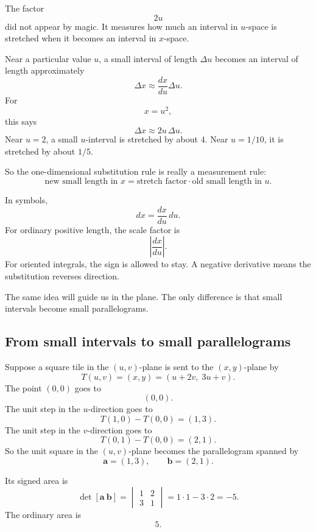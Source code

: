 The factor
\[
    2u
\]
did not appear by magic.  It measures how much an interval in \(u\)-space is stretched
when it becomes an interval in \(x\)-space.

Near a particular value \(u\), a small interval of length \(\Delta u\) becomes an interval
of length approximately
\[
    \Delta x\approx \frac{dx}{du}\Delta u.
\]
For
\[
    x=u^2,
\]
this says
\[
    \Delta x\approx 2u\,\Delta u.
\]
Near \(u=2\), a small \(u\)-interval is stretched by about \(4\).  Near \(u=1/10\), it is
stretched by about \(1/5\).

So the one-dimensional substitution rule is really a measurement rule:
\[
\boxed{
    \text{new small length in }x
    =
    \text{stretch factor}\cdot \text{old small length in }u.
}
\]

In symbols,
\[
    dx=\frac{dx}{du}\,du.
\]
For ordinary positive length, the scale factor is
\[
    \left|\frac{dx}{du}\right|.
\]
For oriented integrals, the sign is allowed to stay.  A negative derivative means the
substitution reverses direction.

The same idea will guide us in the plane.  The only difference is that small intervals
become small parallelograms.

\subsection{From small intervals to small parallelograms}

Suppose a square tile in the \((u,v)\)-plane is sent to the \((x,y)\)-plane by
\[
    T(u,v)=(x,y)=(u+2v,\;3u+v).
\]
The point \((0,0)\) goes to
\[
    (0,0).
\]
The unit step in the \(u\)-direction goes to
\[
    T(1,0)-T(0,0)=(1,3).
\]
The unit step in the \(v\)-direction goes to
\[
    T(0,1)-T(0,0)=(2,1).
\]
So the unit square in the \((u,v)\)-plane becomes the parallelogram spanned by
\[
    \mathbf a=(1,3),
    \qquad
    \mathbf b=(2,1).
\]

Its signed area is
\[
    \det[\mathbf a\ \mathbf b]
    =
    \begin{vmatrix}
        1&2\\
        3&1
    \end{vmatrix}
    =
    1\cdot1-3\cdot2
    =
    -5.
\]
The ordinary area is
\[
    5.
\]

